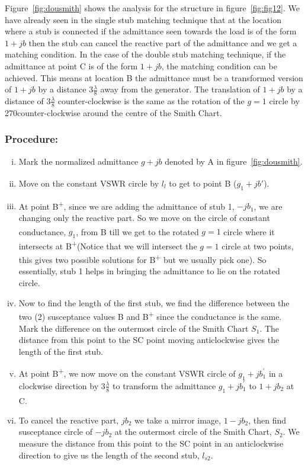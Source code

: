 Figure~\ref{fig:dousmith} shows the analysis for the structure in figure~\ref{fig:fig12}. We have already seen in the single stub matching technique that at the location where a stub is connected if the admittance seen towards the load is of the form $1 +jb$ then the stub can cancel the reactive part of the admittance and we get a matching condition. In the case of the double stub matching technique, if the admittance at point C is of the form $1 + jb$, the matching condition can be achieved. This means at location B the admittance must be a transformed version of $1 + jb$ by a distance $3\frac{\lambda}{8}$ away from the generator. The translation of $1 + jb$ by a distance of $3\frac{\lambda}{8}$ counter-clockwise is the same as the rotation of the $g = 1$ circle by 270\textdegree counter-clockwise around the centre of the Smith Chart.

\subsubsection*{Procedure:}
\begin{enumerate}[(i)]
\item Mark the normalized admittance $g + jb$ denoted by A in figure~\ref{fig:dousmith}.
\item Move on the constant VSWR circle by $l_l$ to get to point B\textsuperscript{\textemdash} ($g_1 + jb'$).
\item At point B\textsuperscript{+}, since we are adding the admittance of stub 1, $-jb_{1}$, we are changing only the reactive part. So we move on the circle of constant conductance, $g_1$, from B\textsuperscript{\textemdash} till we get to the rotated $g = 1$ circle where it intersects at B\textsuperscript{+}(Notice that we will intersect the $g = 1$ circle at two points, this gives two possible solutions for B\textsuperscript{+} but we usually pick one). So essentially, stub 1 helps in bringing the admittance to lie on the rotated circle.
\item Now to find the length of the first stub, we find the difference between the two (2) susceptance values B\textsuperscript{\textemdash} and B\textsuperscript{+} since the conductance is the same. Mark the difference on the outermost circle of the Smith Chart $S_1$. The distance from this point to the SC point moving anticlockwise gives the length of the first stub.
\item At point B\textsuperscript{+}, we now move on the constant VSWR circle of $g_{1} + jb_1^{'}$ in a clockwise direction by $ 3\frac{\lambda}{8}$ to transform the admittance $g_1 + jb_1^{'}$ to $1 + jb_2$ at C\textsuperscript{\textemdash}.
\item To cancel the reactive part, $jb_2$ we take a mirror image, $1-jb_2$, then find susceptance circle of $-jb_2$ at the outermost circle of the Smith Chart, $S_2$. We measure the distance from this point to the SC point in an anticlockwise direction to give us the length of the second stub, $l_{s2}$.
\end{enumerate}

